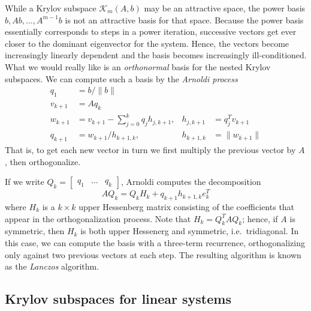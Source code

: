 \documentclass[12pt, leqno]{article}
\newcommand{\calK}{\mathcal{K}}
\begin{document}
While a Krylov subspace $\calK_m(A,b)$ may be an attractive space,
the power basis $b, Ab, \ldots, A^{m-1} b$ is not an attractive basis
for that space.  Because the power basis essentially corresponds to
steps in a power iteration, successive vectors get ever closer to
the dominant eigenvector for the system.  Hence, the vectors become
increasingly linearly dependent and the basis becomes increasingly
ill-conditioned.  What we would really like is an {\em orthonormal}
basis for the nested Krylov subspaces.  We can compute such a basis
by the {\em Arnoldi process}
\begin{align*}
  q_1 &= b/\|b\| \\
  v_{k+1} &= Aq_k \\
  w_{k+1} &=
    v_{k+1} - \sum_{j=0}^{k} q_j h_{j,k+1}, & h_{j,k+1} &= q_j^T v_{k+1} \\
  q_{k+1} &=
    w_{k+1} / h_{k+1,k}, & h_{k+1,k} & = \|w_{k+1}\| 
\end{align*}
That is, to get each new vector in turn we first multiply the previous
vector by $A$, then orthogonalize.

If we write $Q_k = \begin{bmatrix} q_1 & \ldots & q_k \end{bmatrix}$,
Arnoldi computes the decomposition
\[
  A Q_k = Q_k H_k + q_{k+1} h_{k+1,k} e_k^T
\]
where $H_k$ is a $k \times k$ upper Hessenberg matrix consisting of
the coefficients that appear in the orthogonalization process.
Note that $H_k = Q_k^T A Q_k$; hence, if $A$ is symmetric, then $H_k$
is both upper Hessenerg and symmetric, i.e.~tridiagonal.  In this
case, we can compute the basis with a three-term recurrence,
orthogonalizing only against two previous vectors at each step.
The resulting algorithm is known as the {\em Lanczos} algorithm.

\subsection{Krylov subspaces for linear systems}
\end{document}

